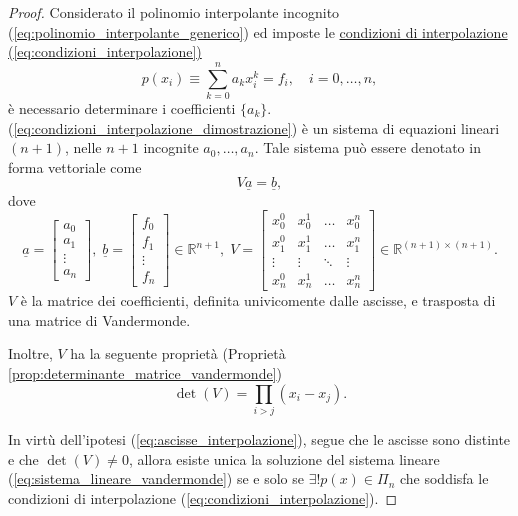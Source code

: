 \begin{proof}
    Considerato il polinomio interpolante incognito (\ref{eq:polinomio_interpolante_generico}) ed imposte le \underline{condizioni di interpolazione (\ref{eq:condizioni_interpolazione})} 
    \begin{equation}\label{eq:condizioni_interpolazione_dimostrazione}
        p(x_i)\equiv\sum_{k=0}^{n}a_kx_i^k=f_i,\quad i=0,\hdots,n,
    \end{equation}
    è necessario determinare i coefficienti $\{a_k\}$. (\ref{eq:condizioni_interpolazione_dimostrazione}) è un sistema di equazioni lineari $(n+1)$, nelle $n+1$ incognite $a_0,\hdots,a_n$. Tale sistema può essere denotato in forma vettoriale come
    \begin{equation}\label{eq:sistema_lineare_vandermonde}
        V\underline{a}=\underline{b},
    \end{equation}
    dove
    \begin{equation*}
        \underline{a} = 
    \begin{bmatrix}
        a_0\\
        a_1\\
        \vdots\\
        a_n
    \end{bmatrix},\; \underline{b}=
    \begin{bmatrix}
        f_0\\
        f_1\\
        \vdots\\
        f_n
    \end{bmatrix}\in\mathbb R^{n+1},\;
    V=\begin{bmatrix}
        x_0^0 & x_0^1 & \hdots & x_0^n\\
        x_1^0 & x_1^1 & \hdots & x_1^n\\
        \vdots & \vdots &\ddots & \vdots\\
        x_n^0 & x_n^1 & \hdots & x_n^n
    \end{bmatrix}\in\mathbb R^{(n+1)\times (n+1)}.
    \end{equation*}
    $V$ è la matrice dei coefficienti, definita univicomente dalle ascisse, e trasposta di una matrice di Vandermonde.
    
    Inoltre, $V$ ha la seguente proprietà (Proprietà \ref{prop:determinante_matrice_vandermonde})
    \begin{equation*}
    	\det(V)= \prod_{i>j}(x_i-x_j).
    \end{equation*}
    
    In virtù dell'ipotesi (\ref{eq:ascisse_interpolazione}), segue che le ascisse sono distinte e che $\det(V)\neq 0$, allora esiste unica la soluzione del sistema lineare (\ref{eq:sistema_lineare_vandermonde}) se e solo se $\exists! p(x)\in\Pi_n$ che soddisfa le condizioni di interpolazione (\ref{eq:condizioni_interpolazione}).
\end{proof}


